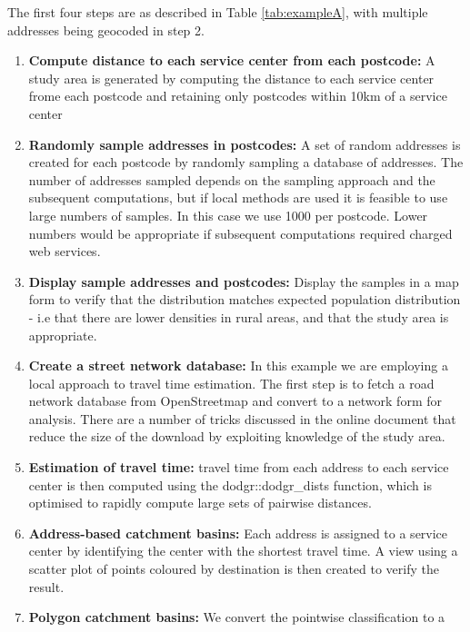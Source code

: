 \documentclass[utf8]{frontiersHLTH}
\begin{document}
\begin{table}[h]
\begin{center}
  \sffamily
  \tiny
\begin{mdframed}[backgroundcolor=blue!20]
The first four steps are as described in Table \ref{tab:exampleA},
with multiple addresses being geocoded in step 2.
\begin{enumerate}
  \def\labelenumi{\arabic{enumi}.}
  \setcounter{enumi}{3}
\item
  {\bf Compute distance to each service center from each postcode:} A study
  area is generated by computing the distance to each service center
  frome each postcode and retaining only postcodes within 10km of a
  service center
\item
 {\bf Randomly sample addresses in postcodes:} A set of random addresses is created for each
  postcode by randomly sampling a database of addresses. The number of
  addresses sampled depends on the sampling approach and the subsequent
  computations, but if local methods are used it is feasible to use
  large numbers of samples. In this case we use 1000 per postcode. Lower
  numbers would be appropriate if subsequent computations required
  charged web services.
\item
  {\bf Display sample addresses and postcodes:} Display the samples in a map
  form to verify that the distribution matches expected population
  distribution - i.e that there are lower densities in rural areas, and
  that the study area is appropriate.
\item
  {\bf Create a street network database:} In this example we are employing a
  local approach to travel time estimation. The first step is to fetch a
  road network database from OpenStreetmap and convert to a network form
  for analysis. There are a number of tricks discussed in the online
  document that reduce the size of the download by exploiting knowledge
  of the study area.
\item
  {\bf Estimation of travel time:} travel time from each address to each
  service center is then computed using the dodgr::dodgr\_dists
  function, which is optimised to rapidly compute large sets of pairwise
  distances.
\item
  {\bf Address-based catchment basins:} Each address is assigned to a service
  center by identifying the center with the shortest travel time. A view
  using a scatter plot of points coloured by destination is then created
  to verify the result.
\item
  {\bf Polygon catchment basins:} We convert the pointwise classification to a

\end{enumerate}
\end{mdframed}
\end{center}
\end{table}
\end{document}
